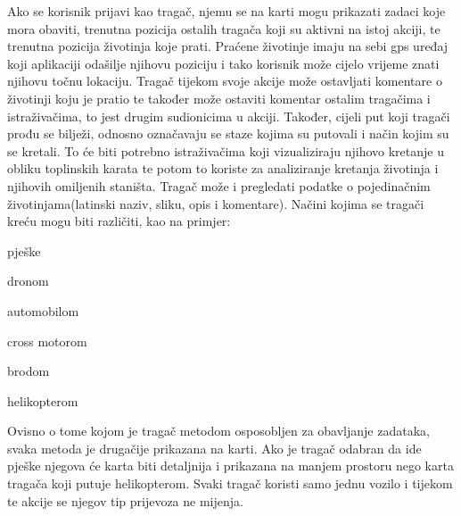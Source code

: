 	Ako se korisnik prijavi kao tragač, njemu se na karti mogu prikazati zadaci koje mora obaviti, trenutna pozicija ostalih tragača koji su aktivni na istoj akciji, te trenutna pozicija životinja koje prati.
	Praćene životinje imaju na sebi gps uređaj koji aplikaciji odašilje njihovu poziciju i tako korisnik može cijelo vrijeme znati njihovu točnu lokaciju. 
	Tragač tijekom svoje akcije može ostavljati komentare o životinji koju je pratio te također može ostaviti komentar ostalim tragačima i istraživačima, to jest drugim sudionicima u akciji.
	Također, cijeli put koji tragači prođu se bilježi, odnosno označavaju se staze kojima su putovali i način kojim su se kretali. To će biti potrebno istraživačima koji vizualiziraju njihovo kretanje u obliku toplinskih karata 
	te potom to koriste za analiziranje kretanja životinja i njihovih omiljenih staništa. Tragač može i pregledati podatke o pojedinačnim životinjama(latinski naziv, sliku, opis i komentare). 
	Načini kojima se tragači kreću mogu biti različiti, kao na primjer:
	\begin{packed_item}
		\item pješke
		\item dronom
		\item automobilom
		\item cross motorom
		\item brodom
		\item helikopterom
	\end{packed_item}

	Ovisno o tome kojom je tragač metodom osposobljen za obavljanje zadataka, svaka metoda je drugačije prikazana na karti.
	Ako je tragač odabran da ide pješke njegova će karta biti detaljnija i prikazana na manjem prostoru nego karta tragača koji putuje helikopterom. 
	Svaki tragač koristi samo jednu vozilo i tijekom te akcije se njegov tip prijevoza ne mijenja.

